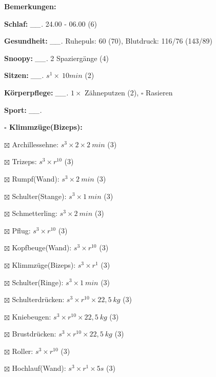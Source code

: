 \documentclass[10pt,a4paper]{article}
\newcommand\prop[1] {{\color {alizarin} {\bf #1}}}             %
\newcommand\mand[1] {{\color {burntorange} {\bf #1}}}          %
\newcommand\topspace{\vskip -15pt \hskip 20pt}
\newcommand\n[1] { {\sl #1.} \hskip 5pt }
\begin{document}
\begin{mdframed}[style=daystyle]
  \begin{labeling}{{\mand {Bemerkungen:}}}
    \setlength\itemsep{-3pt}
  \item[{\mand {Schlaf:}}]        \n{\_\_} 24.00 - 06.00 (6)
  \item[{\mand {Gesundheit:}}]    \n{\_\_} Ruhepuls: 60 (70), Blutdruck: 116/76 (143/89)
  \item[{\mand {Snoopy:}}]        \n{\_\_} 2 Spaziergänge (4)   
  \item[{\mand {Sitzen:}}]        \n{\_\_} $s^1 \times\ 10 min$ (2)
  \item[{\mand {Körperpflege:}}]  \n{\_\_} $1 \times$ Zähneputzen (2), $\square$ Rasieren
  \item[{\mand {Sport:}}]         \n{\_\_}
    \topspace
    \begin{minipage}{0.75\textwidth}  
      \begin{labeling}{\prop {$\square$ {Klimmzüge(Bizeps):}}}
        \setlength\itemsep{-3pt}
      \item[$\boxtimes$ Archillessehne:]    $s^3 \times 2 \times 2\ min$ (3)
      \item[$\boxtimes$ Trizeps:]           $s^3 \times r^{10}$ (3)
      \item[$\boxtimes$ Rumpf(Wand):]       $s^3 \times 2\ min$ (3)
      \item[$\boxtimes$ Schulter(Stange):]  $s^3 \times 1\ min$ (3)
      \item[$\boxtimes$ Schmetterling:]     $s^3 \times 2\ min$ (3)
      \item[$\boxtimes$ Pflug:]             $s^3 \times r^{10}$ (3)
      \item[$\boxtimes$ Kopfbeuge(Wand):]   $s^3 \times r^{10}$ (3)
      \item[$\boxtimes$ Klimmzüge(Bizeps):] $s^3 \times r^1$ (3)
      \item[$\boxtimes$ Schulter(Ringe):]   $s^3 \times 1\ min$ (3)
      \item[$\boxtimes$ Schulterdrücken:]   $s^3 \times r^{10} \times 22,5\ kg$ (3)
      \item[$\boxtimes$ Kniebeugen:]        $s^3 \times r^{10} \times 22,5\ kg$ (3)
      \item[$\boxtimes$ Brustdrücken:]      $s^3 \times r^{10} \times 22,5\ kg$ (3)
      \item[$\boxtimes$ Roller:]            $s^3 \times r^{10}$ (3)
      \item[$\boxtimes$ Hochlauf(Wand):]    $s^3 \times r^{1} \times 5s$ (3)

\end{labeling}
\end{minipage}
\end{labeling}
\end{mdframed}
\end{document}
